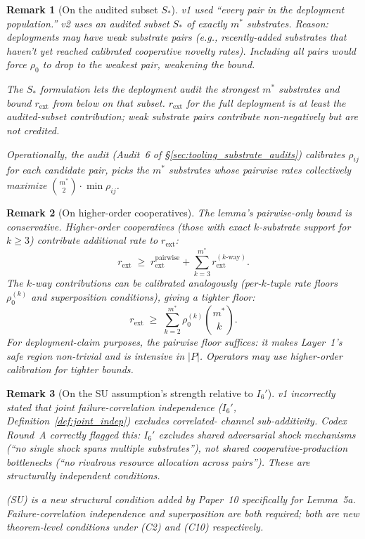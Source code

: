 \documentclass{article}
\newtheorem{remark}{Remark}
\newcommand{\rext}{r_{\mathrm{ext}}}
\newcommand{\Saudit}{S_*}
\begin{document}
\begin{remark}[On the audited subset $\Saudit$]
\label{rem:saudit}
v1 used ``every pair in the deployment population.''  v2 uses an
audited subset $\Saudit$ of exactly $m^*$ substrates.  Reason:
deployments may have weak substrate pairs (e.g., recently-added
substrates that haven't yet reached calibrated cooperative
novelty rates).  Including all pairs would force $\rho_0$ to drop
to the weakest pair, weakening the bound.

The $\Saudit$ formulation lets the deployment audit the strongest
$m^*$ substrates and bound $\rext$ from below on that subset.
$\rext$ for the full deployment is at least the audited-subset
contribution; weak substrate pairs contribute non-negatively but
are not credited.

Operationally, the audit (Audit~6 of
\S\ref{sec:tooling_substrate_audits}) calibrates $\rho_{ij}$ for
each candidate pair, picks the $m^*$ substrates whose pairwise
rates collectively maximize $\binom{m^*}{2} \cdot \min \rho_{ij}$.
\end{remark}

\begin{remark}[On higher-order cooperatives]
\label{rem:higher_order}
The lemma's pairwise-only bound is conservative.  Higher-order
cooperatives (those with exact $k$-substrate support for $k \geq
3$) contribute additional rate to $\rext$:
\[
  \rext \;\geq\; \rext^{\mathrm{pairwise}} +
  \sum_{k=3}^{m^*} \rext^{(k\text{-way})}.
\]
The $k$-way contributions can be calibrated analogously
(per-$k$-tuple rate floors $\rho_0^{(k)}$ and superposition
conditions), giving a tighter floor:
\[
  \rext \;\geq\; \sum_{k=2}^{m^*} \rho_0^{(k)} \binom{m^*}{k}.
\]
For deployment-claim purposes, the pairwise floor suffices: it
makes Layer~1's safe region non-trivial and is intensive in $|P|$.
Operators may use higher-order calibration for tighter bounds.
\end{remark}

\begin{remark}[On the SU assumption's strength relative to $I_6'$]
\label{rem:SU_vs_I6}
v1 incorrectly stated that joint failure-correlation independence
($I_6'$, Definition~\ref{def:joint_indep}) excludes correlated-
channel sub-additivity.  Codex Round~A correctly flagged this:
$I_6'$ excludes \emph{shared adversarial shock mechanisms}
(``no single shock spans multiple substrates''), not \emph{shared
cooperative-production bottlenecks} (``no rivalrous resource
allocation across pairs'').  These are structurally independent
conditions.

(SU) is a new structural condition added by Paper~10 specifically
for Lemma~5a.  Failure-correlation independence and superposition
are both required; both are new theorem-level conditions under
(C2) and (C10) respectively.
\end{remark}
\end{document}
